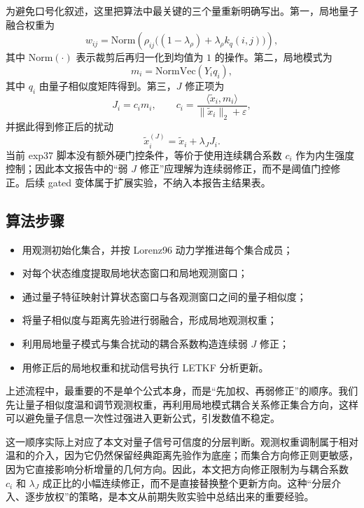 为避免口号化叙述，这里把算法中最关键的三个量重新明确写出。第一，局地量子融合权重为
\begin{equation}
w_{ij}=\mathrm{Norm}\!\left(\rho_{ij}\big((1-\lambda_\rho)+\lambda_\rho k_q(i,j)\big)\right),
\end{equation}
其中 $\mathrm{Norm}(\cdot)$ 表示裁剪后再归一化到均值为 $1$ 的操作。第二，局地模式为
\begin{equation}
m_i=\mathrm{NormVec}(Y_i q_i),
\end{equation}
其中 $q_i$ 由量子相似度矩阵得到。第三，$J$ 修正项为
\begin{equation}
J_i=c_i m_i,\qquad c_i=\frac{\langle \tilde{x}_i,m_i\rangle}{\|\tilde{x}_i\|_2+\varepsilon},
\end{equation}
并据此得到修正后的扰动
\begin{equation}
\tilde{x}_i^{(J)}=\tilde{x}_i+\lambda_J J_i.
\end{equation}
当前 exp37 脚本没有额外硬门控条件，等价于使用连续耦合系数 $c_i$ 作为内生强度控制；因此本文报告中的“弱 $J$ 修正”应理解为连续弱修正，而不是阈值门控修正。后续 gated 变体属于扩展实验，不纳入本报告主结果表。

\subsection{算法步骤}
\begin{itemize}
\item 用观测初始化集合，并按 Lorenz96 动力学推进每个集合成员；
\item 对每个状态维度提取局地状态窗口和局地观测窗口；
\item 通过量子特征映射计算状态窗口与各观测窗口之间的量子相似度；
\item 将量子相似度与距离先验进行弱融合，形成局地观测权重；
\item 利用局地量子模式与集合扰动的耦合系数构造连续弱 $J$ 修正；
\item 用修正后的局地权重和扰动信号执行 LETKF 分析更新。
\end{itemize}

上述流程中，最重要的不是单个公式本身，而是“先加权、再弱修正”的顺序。我们先让量子相似度温和调节观测权重，再利用局地模式耦合关系修正集合方向，这样可以避免量子信息一次性过强进入更新公式，引发数值不稳定。

这一顺序实际上对应了本文对量子信号可信度的分层判断。观测权重调制属于相对温和的介入，因为它仍然保留经典距离先验作为底座；而集合方向修正则更敏感，因为它直接影响分析增量的几何方向。因此，本文把方向修正限制为与耦合系数 $c_i$ 和 $\lambda_J$ 成正比的小幅连续修正，而不是直接替换整个更新方向。这种“分层介入、逐步放权”的策略，是本文从前期失败实验中总结出来的重要经验。


